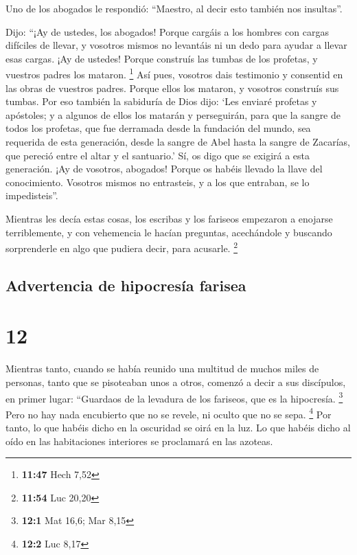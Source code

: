  Uno de los abogados le respondió: ``Maestro, al decir
esto también nos insultas''.

 Dijo: ``¡Ay de ustedes, los abogados! Porque cargáis a
los hombres con cargas difíciles de llevar, y vosotros mismos no
levantáis ni un dedo para ayudar a llevar esas cargas. 
¡Ay de ustedes! Porque construís las tumbas de los profetas, y vuestros
padres los mataron. \footnote{\textbf{11:47} Hech 7,52} 
Así pues, vosotros dais testimonio y consentid en las obras de vuestros
padres. Porque ellos los mataron, y vosotros construís sus tumbas.
 Por eso también la sabiduría de Dios dijo: `Les enviaré
profetas y apóstoles; y a algunos de ellos los matarán y perseguirán,
 para que la sangre de todos los profetas, que fue
derramada desde la fundación del mundo, sea requerida de esta
generación,  desde la sangre de Abel hasta la sangre de
Zacarías, que pereció entre el altar y el santuario.' Sí, os digo que se
exigirá a esta generación.  ¡Ay de vosotros, abogados!
Porque os habéis llevado la llave del conocimiento. Vosotros mismos no
entrasteis, y a los que entraban, se lo impedisteis''.

 Mientras les decía estas cosas, los escribas y los
fariseos empezaron a enojarse terriblemente, y con vehemencia le hacían
preguntas,  acechándole y buscando sorprenderle en algo
que pudiera decir, para acusarle. \footnote{\textbf{11:54} Luc 20,20}

\hypertarget{advertencia-de-hipocresuxeda-farisea}{%
\subsection{Advertencia de hipocresía
farisea}\label{advertencia-de-hipocresuxeda-farisea}}

\hypertarget{section-11}{%
\section{12}\label{section-11}}

 Mientras tanto, cuando se había reunido una multitud de
muchos miles de personas, tanto que se pisoteaban unos a otros, comenzó
a decir a sus discípulos, en primer lugar: ``Guardaos de la levadura de
los fariseos, que es la hipocresía. \footnote{\textbf{12:1} Mat 16,6;
  Mar 8,15}  Pero no hay nada encubierto que no se revele,
ni oculto que no se sepa. \footnote{\textbf{12:2} Luc 8,17}
 Por tanto, lo que habéis dicho en la oscuridad se oirá en
la luz. Lo que habéis dicho al oído en las habitaciones interiores se
proclamará en las azoteas.

